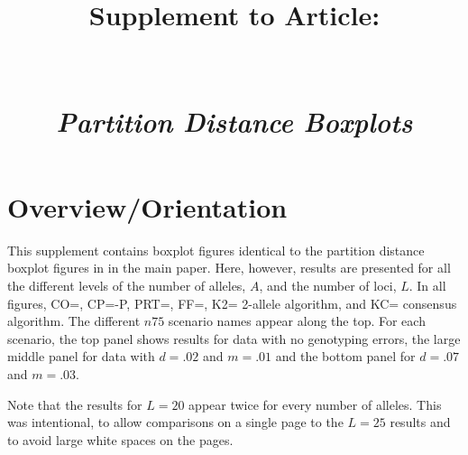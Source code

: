 \documentclass[11pt,landscape]{report}
\title{Supplement \SupNum{} to Article:\\
\ArticleName\\
\mbox{}\\
{\em Partition Distance Boxplots} }
\begin{document}
\maketitle
\section{Overview/Orientation}
This supplement contains boxplot figures identical to the partition distance boxplot figures in in the main paper.  Here, however, results are presented for all the different levels of the number of alleles, $A$, and the number of loci, $L$.  In all figures, CO=\colony, CP=\colony{}-P, PRT=\prt{}, FF=\familyfinder, K2=\kinalyzer{} 2-allele algorithm, and KC=\kinalyzer{} consensus algorithm. The different $n75$ scenario names appear along the top.  For each scenario, the top panel shows results for data with no genotyping errors, the large middle panel for data with $d=.02$ and $m=.01$ and the bottom panel for $d=.07$ and $m=.03$.

Note that the results for $L=20$ appear twice for every number of alleles. This was intentional, to allow comparisons on a single page to the $L=25$ results and to avoid large white spaces on the pages.

\tableofcontents
\listoffigures


\end{document}
